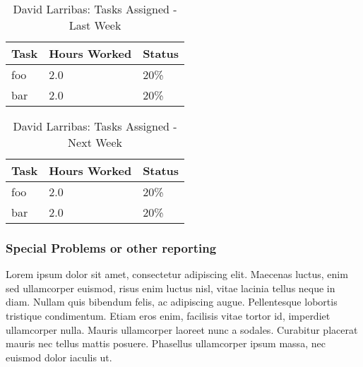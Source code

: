 \documentclass[12pt,article,compsoc]{IEEEtran}
\begin{document}
	\begin{table}[ht]
	\renewcommand{\arraystretch}{1.3}
		\caption{David Larribas: Tasks Assigned - Last Week}
		
		\label{Summary of David Larribas' activities: last week}
		
		\centering
		\begin{tabular}{p{5.5cm}|p{1cm}|p{1cm}}
		\hline
		\bfseries 	Task		 		& \bfseries Hours Worked	& \bfseries Status	\\
		\hline\hline
					foo					& 2.0						& 20\%				\\	%
					bar					& 2.0						& 20\%				\\	
		\hline
		\end{tabular}
	\end{table}

	\begin{table}[ht]
	\renewcommand{\arraystretch}{1.3}
		\caption{David Larribas: Tasks Assigned - Next Week}
		
		\label{Summary of David Larribas' activites: this week}
		
		\centering
		\begin{tabular}{p{5.5cm}|p{1cm}|p{1cm}}
		\hline

		\bfseries 	Task		 		& \bfseries Hours Worked	& \bfseries Status	\\
		\hline\hline
					foo					& 2.0						& 20\%				\\	%
					bar					& 2.0						& 20\%				\\	
		\hline
		\end{tabular}
	\end{table}

	\subsubsection*{Special Problems or other reporting}
	Lorem ipsum dolor sit amet, consectetur adipiscing elit. Maecenas luctus, enim sed ullamcorper euismod, risus enim luctus nisl, vitae lacinia tellus neque in diam. Nullam quis bibendum felis, ac adipiscing augue. Pellentesque lobortis tristique condimentum. Etiam eros enim, facilisis vitae tortor id, imperdiet ullamcorper nulla. Mauris ullamcorper laoreet nunc a sodales. Curabitur placerat mauris nec tellus mattis posuere. Phasellus ullamcorper ipsum massa, nec euismod dolor iaculis ut.
\end{document}
